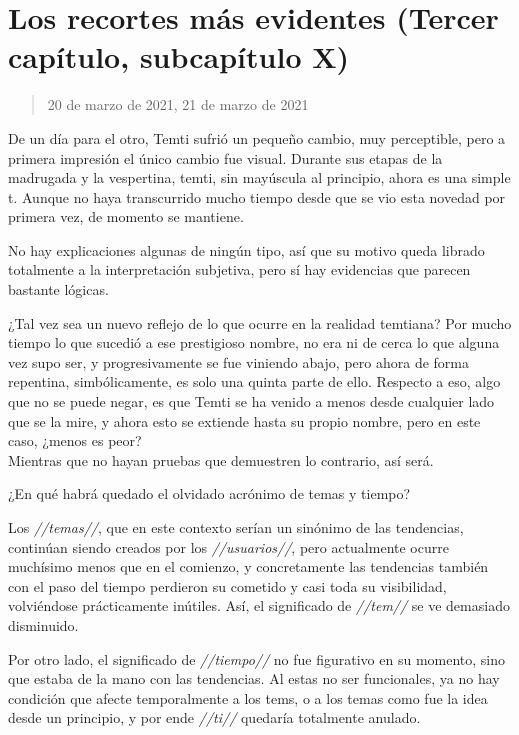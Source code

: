 \documentclass[
  spanish,
]{book}
\begin{document}
\hypertarget{los-recortes-muxe1s-evidentes-tercer-capuxedtulo-subcapuxedtulo-x}{%
\section{Los recortes más evidentes (Tercer capítulo, subcapítulo X)}\label{los-recortes-muxe1s-evidentes-tercer-capuxedtulo-subcapuxedtulo-x}}

\begin{quote}
20 de marzo de 2021, 21 de marzo de 2021
\end{quote}

De un día para el otro, Temti sufrió un pequeño cambio, muy perceptible, pero a primera impresión el único cambio fue visual. Durante sus etapas de la madrugada y la vespertina, temti, sin mayúscula al principio, ahora es una simple t. Aunque no haya transcurrido mucho tiempo desde que se vio esta novedad por primera vez, de momento se mantiene.

No hay explicaciones algunas de ningún tipo, así que su motivo queda librado totalmente a la interpretación subjetiva, pero sí hay evidencias que parecen bastante lógicas.

¿Tal vez sea un nuevo reflejo de lo que ocurre en la realidad temtiana? Por mucho tiempo lo que sucedió a ese prestigioso nombre, no era ni de cerca lo que alguna vez supo ser, y progresivamente se fue viniendo abajo, pero ahora de forma repentina, simbólicamente, es solo una quinta parte de ello. Respecto a eso, algo que no se puede negar, es que Temti se ha venido a menos desde cualquier lado que se la mire, y ahora esto se extiende hasta su propio nombre, pero en este caso, ¿menos es peor?\\
Mientras que no hayan pruebas que demuestren lo contrario, así será.

¿En qué habrá quedado el olvidado acrónimo de temas y tiempo?

Los \emph{//temas//}, que en este contexto serían un sinónimo de las tendencias, continúan siendo creados por los \emph{//usuarios//}, pero actualmente ocurre muchísimo menos que en el comienzo, y concretamente las tendencias también con el paso del tiempo perdieron su cometido y casi toda su visibilidad, volviéndose prácticamente inútiles. Así, el significado de \emph{//tem//} se ve demasiado disminuido.

Por otro lado, el significado de \emph{//tiempo//} no fue figurativo en su momento, sino que estaba de la mano con las tendencias. Al estas no ser funcionales, ya no hay condición que afecte temporalmente a los tems, o a los temas como fue la idea desde un principio, y por ende \emph{//ti//} quedaría totalmente anulado.
\end{document}
